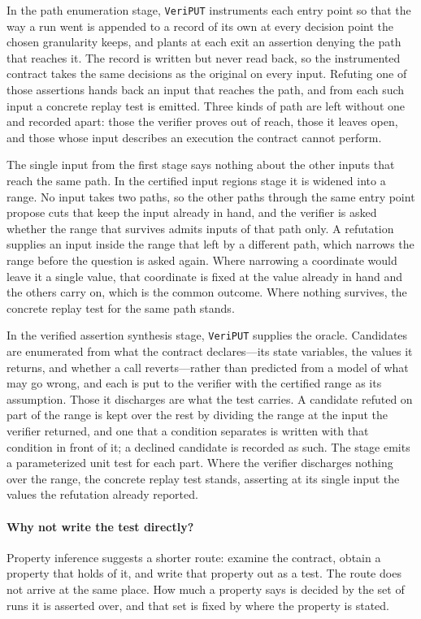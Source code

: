 \documentclass[manuscript,anonymous]{acmart}
\newcommand{\tool}[1]{\texttt{#1}}
\begin{document}
In the path enumeration stage, \tool{VeriPUT} instruments each entry point so
that the way a run went is appended to a record of its own at every decision
point the chosen granularity keeps, and plants at each exit an assertion denying
the path that reaches it. The record is written but never read back, so the
instrumented contract takes the same decisions as the original on every input.
Refuting one of those assertions hands back an input that reaches the path, and
from each such input a concrete replay test is emitted. Three kinds of path are
left without one and recorded apart: those the verifier proves out of reach,
those it leaves open, and those whose input describes an execution the contract
cannot perform.

The single input from the first stage says nothing about the other inputs that
reach the same path. In the certified input regions stage it is widened into a
range. No input takes two paths, so the other paths through the same entry point
propose cuts that keep the input already in hand, and the verifier is asked
whether the range that survives admits inputs of that path only. A refutation
supplies an input inside the range that left by a different path, which narrows
the range before the question is asked again. Where narrowing a coordinate would
leave it a single value, that coordinate is fixed at the value already in hand
and the others carry on, which is the common outcome. Where nothing survives,
the concrete replay test for the same path stands.

In the verified assertion synthesis stage, \tool{VeriPUT} supplies the oracle.
Candidates are enumerated from what the contract declares---its state variables,
the values it returns, and whether a call reverts---rather than predicted from a
model of what may go wrong, and each is put to the verifier with the certified
range as its assumption. Those it discharges are what the test carries. A candidate
refuted on part of the range is kept over the rest by dividing the range at the
input the verifier returned, and one that a condition separates is written with
that condition in front of it; a declined candidate is recorded as such. The
stage emits a parameterized unit test for each part. Where the verifier
discharges nothing over the range, the concrete replay test stands, asserting at
its single input the values the refutation already reported.

\paragraph{Why not write the test directly?}
Property inference suggests a shorter route: examine the contract, obtain a
property that holds of it, and write that property out as a test. The route does
not arrive at the same place. How much a property says is decided by the set of
runs it is asserted over, and that set is fixed by where the property is stated.
\end{document}
